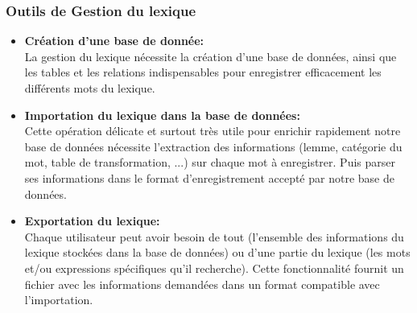 \documentclass[a4paper, 12pt]{article}
\begin{document}
\subsubsection{Outils de Gestion du lexique}
\begin{itemize}
    \item \textbf{Création d'une base de donnée:} \\
        La gestion du lexique nécessite la création d'une base de données, ainsi que les tables et les relations indispensables pour enregistrer efficacement les différents mots du lexique. 
    \item \textbf{Importation du lexique dans la base de données:}\\
        Cette opération délicate et surtout très utile pour enrichir rapidement notre base de données nécessite l'extraction des informations (lemme, catégorie du mot, table de transformation, ...) sur chaque mot à enregistrer. Puis parser ses informations dans le format d'enregistrement accepté par notre base de données.   
    \item \textbf{Exportation du lexique:}\\
        Chaque utilisateur peut avoir besoin de tout (l'ensemble des informations du lexique stockées dans la base de données) ou d'une partie du lexique (les mots et/ou  expressions spécifiques qu'il recherche). Cette fonctionnalité fournit un fichier avec les informations demandées dans un format compatible avec l'importation.
\end{itemize}{}
\end{document}
